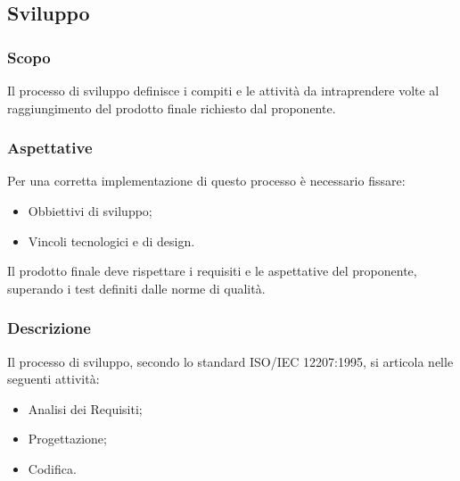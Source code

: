 \subsection{Sviluppo}
		\subsubsection{Scopo}
			Il processo di sviluppo definisce i compiti e le attività da intraprendere volte al raggiungimento del prodotto finale richiesto dal proponente.
		\subsubsection{Aspettative}
			Per una corretta implementazione di questo processo è necessario fissare:
				\begin{itemize}
					\item Obbiettivi di sviluppo;
					\item Vincoli tecnologici e di design.
				\end{itemize}	
			Il prodotto finale deve rispettare i requisiti e le aspettative del proponente, superando i test definiti dalle norme di qualità.
		\subsubsection{Descrizione}
			Il processo di sviluppo, secondo lo standard ISO/IEC 12207:1995, si articola nelle seguenti attività:
				\begin{itemize}
					\item Analisi dei Requisiti;
					\item Progettazione;
					\item Codifica.
				\end{itemize}
